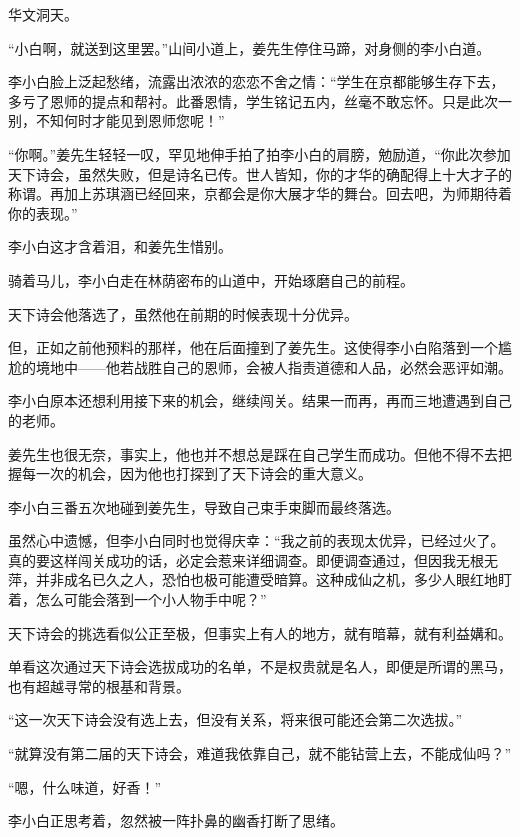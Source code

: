 
\begin{this_body}

华文洞天。

“小白啊，就送到这里罢。”山间小道上，姜先生停住马蹄，对身侧的李小白道。

李小白脸上泛起愁绪，流露出浓浓的恋恋不舍之情：“学生在京都能够生存下去，多亏了恩师的提点和帮衬。此番恩情，学生铭记五内，丝毫不敢忘怀。只是此次一别，不知何时才能见到恩师您呢！”

“你啊。”姜先生轻轻一叹，罕见地伸手拍了拍李小白的肩膀，勉励道，“你此次参加天下诗会，虽然失败，但是诗名已传。世人皆知，你的才华的确配得上十大才子的称谓。再加上苏琪涵已经回来，京都会是你大展才华的舞台。回去吧，为师期待着你的表现。”

李小白这才含着泪，和姜先生惜别。

骑着马儿，李小白走在林荫密布的山道中，开始琢磨自己的前程。

天下诗会他落选了，虽然他在前期的时候表现十分优异。

但，正如之前他预料的那样，他在后面撞到了姜先生。这使得李小白陷落到一个尴尬的境地中——他若战胜自己的恩师，会被人指责道德和人品，必然会恶评如潮。

李小白原本还想利用接下来的机会，继续闯关。结果一而再，再而三地遭遇到自己的老师。

姜先生也很无奈，事实上，他也并不想总是踩在自己学生而成功。但他不得不去把握每一次的机会，因为他也打探到了天下诗会的重大意义。

李小白三番五次地碰到姜先生，导致自己束手束脚而最终落选。

虽然心中遗憾，但李小白同时也觉得庆幸：“我之前的表现太优异，已经过火了。真的要这样闯关成功的话，必定会惹来详细调查。即便调查通过，但因我无根无萍，并非成名已久之人，恐怕也极可能遭受暗算。这种成仙之机，多少人眼红地盯着，怎么可能会落到一个小人物手中呢？”

天下诗会的挑选看似公正至极，但事实上有人的地方，就有暗幕，就有利益媾和。

单看这次通过天下诗会选拔成功的名单，不是权贵就是名人，即便是所谓的黑马，也有超越寻常的根基和背景。

“这一次天下诗会没有选上去，但没有关系，将来很可能还会第二次选拔。”

“就算没有第二届的天下诗会，难道我依靠自己，就不能钻营上去，不能成仙吗？”

“嗯，什么味道，好香！”

李小白正思考着，忽然被一阵扑鼻的幽香打断了思绪。


\end{this_body}
